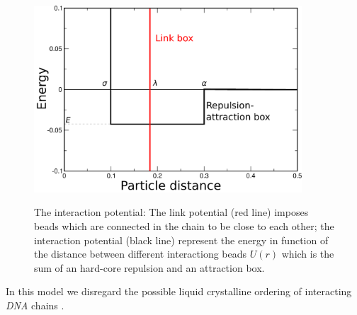 \documentclass[12pt,a4paper,notitlepage]{article}
\newcommand{\fis}{\emph{Fis}\xspace}
\newcommand{\crp}{\emph{CRP}\xspace}
\newcommand{\hns}{\emph{H-NS}\xspace}
\newcommand{\dna}{\emph{DNA}\xspace}
\newcommand{\naps}{\emph{NAPs}\xspace}
\begin{document}
\begin{figure}[h!]
\centering
\includegraphics[width=10cm]{potential}\\
\caption{The interaction potential: The link potential (red
  line) imposes beads which are connected in the 
  chain to be close to each other;
  the interaction potential (black line) represent the energy in
  function of the distance between different interactiong beads $U(r)$
  which is the sum of an hard-core repulsion and an attraction box.
}
\label{fig:potential}
\end{figure}

In this model we disregard the possible liquid crystalline ordering of
interacting \dna chains \cite{Nakata2007}.
\end{document}
